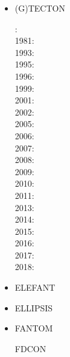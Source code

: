 \begin{itemize}
 
\item (G)TECTON

: \cite{mera80}\\
1981: \cite{mera81}\\
1993: \cite{gowo93}\\
1995: \cite{gowo95}\\
1996: \cite{guez96}\cite{gisb96}\\
1999: \cite{gowo99}\cite{fugo99}\\
2001: \cite{bugw01}\cite{gome01}\\
2002: \cite{bugw02}\\
2005: \cite{gowo05}\cite{vanw05}\cite{vabl05}\cite{gowo05}\\
2006: \cite{degw06}\cite{libi06}\cite{scdm06}\\
2007: \cite{vabl07}\\
2008: \cite{degw08}\cite{degw08b}\\
2009: \cite{ladg09}\cite{plmg09}\\
2010: \cite{vago10}\cite{plmf10}\\
2011: \cite{bagw11}\cite{bagw11b}\\
2013: \cite{plab13}\cite{wagw13}\\
2014: \cite{vagw14}\\
2015: \cite{mags15}\cite{nigo15}\\
2016: \cite{gemg16}\cite{masg16}\\
2017: \cite{ozgw17}\\
2018: \cite{gofv18}\cite{nigw18}\cite{hefg18}

\item ELEFANT

\cite{tosn15}
\cite{matv15}
\cite{busa16}
\cite{latb17}
\cite{thie17}
\cite{pltv18}
\cite{wohu19}

\item ELLIPSIS

\cite{modm03}
\cite{omma06} 
\cite{moql07}
\cite{dyrm07}
\cite{onlg08}
\cite{pyeg10}
\cite{legu11}
\cite{lega12}
\cite{recf14}


\item FANTOM

\cite{thie11}
\cite{alht11}
\cite{alht12}
\cite{alhf13}
\cite{erhv14}
\cite{thsh14}
\cite{erhv15}
\cite{erhv19}

\index FDCON

\cite{enbs05}
\cite{fusc13}
\cite{fuks15}



\end{itemize}
